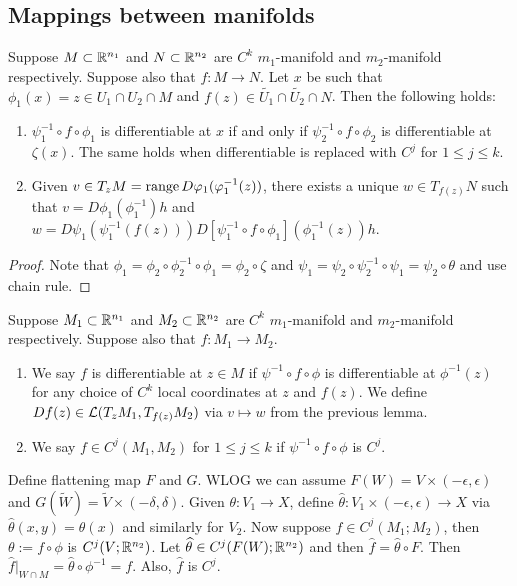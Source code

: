 \documentclass[a4paper]{article}
\newcommand{\TODO}{\textcolor{red}{\textbf{*** TO-DO ***}}}
\begin{document}
\subsection{Mappings between manifolds}

\fbox{\TODO: Add picture}

\begin{lemma}
Suppose $M \subset \mathbb{R}^{n_1}$ and $N \subset \mathbb{R}^{n_2}$ are 
$C^k$ $m_1$-manifold and $m_2$-manifold respectively. 
Suppose also that $f : M \to N$.
Let $x$ be such that $\phi_1(x) = z \in U_1 \cap U_2 \cap M$
and $f(z) \in \tilde{U_1} \cap \tilde{U_2} \cap N$.
Then the following holds: 
\begin{enumerate}
\item $\psi_1^{-1} \circ f \circ \phi_1$ is differentiable 
at $x$ if and only if $\psi_2^{-1} \circ f \circ \phi_2$
is differentiable at $\zeta(x)$.
The same holds when differentiable is replaced with 
$C^j$ for $1 \leq j \leq k$.

\item Given $v \in T_z M = \operatorname{range} D \varphi_1 (\varphi_1^{-1}(z))$, 
there exists a unique $w \in T_{f(z)} N$ such that 
$v = D \phi_1 (\phi_1^{-1}) h$ and 
$w = D \psi_1 (\psi_1^{-1} (f(z))) 
D [\psi_1^{-1} \circ f \circ \phi_1] (\phi_1^{-1}(z)) h$.
\end{enumerate}
\end{lemma}

\begin{proof}
Note that 
$\phi_1 = \phi_2 \circ \phi_2^{-1} \circ \phi_1 = \phi_2 \circ 
\zeta$ and $\psi_1 = \psi_2 \circ \psi_2^{-1} \circ \psi_1 
= \psi_2 \circ \theta$ and use chain rule.
\end{proof}

\begin{defi}
Suppose $M_1 \subset \mathbb{R}^{n_1}$ and $M_2 \subset \mathbb{R}^{n_2}$ are 
$C^k$ $m_1$-manifold and $m_2$-manifold respectively. 
Suppose also that $f : M_1 \to M_2$.

\begin{enumerate}
\item We say $f$ is differentiable at $z \in M$ 
if $\psi^{-1} \circ f \circ \phi$ is differentiable 
at $\phi^{-1}(z)$ for any choice of $C^k$ local coordinates
at $z$ and $f(z)$. We define 
$Df(z) \in \mathcal{L}(T_z M_1, T_{f(z)} M_2)$ via $v \mapsto w$ 
from the previous lemma.

\item We say $f \in C^j (M_1, M_2)$ for $1 \leq j \leq k$ 
if $\psi^{-1} \circ f \circ \phi$ is $C^j$.
\end{enumerate}
\end{defi}

Define flattening map $F$ and $G$. WLOG we can assume 
$F(W) = V \times (-\epsilon, \epsilon)$ and 
$G(\tilde{W}) = \tilde{V} \times (-\delta, \delta)$.
Given $\theta: V_1 \to X$, define $\hat{\theta} : 
V_1 \times (-\epsilon, \epsilon) \to X$ via 
$\hat{\theta}(x, y) = \theta(x)$ and similarly for $V_2$.
Now suppose $f \in C^j (M_1 ; M_2)$, then 
$\theta := f \circ \phi$ is $C^j(V; \mathbb{R}^{n_2})$.
Let $\widehat{\theta} \in C^j (F(W) ; \mathbb{R}^{n_2})$ 
and then $\hat{f} = \hat{\theta} \circ F$. 
Then $\hat{f} \vert_{W \cap M} = \hat{\theta} \circ\phi^{-1}
= f$. Also, $\hat{f}$ is $C^j$.
\end{document}
